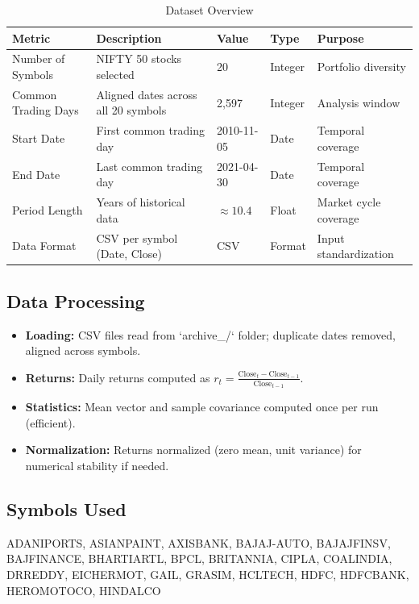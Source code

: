 \documentclass[12pt,a4paper]{article}
\begin{document}
\begin{longtable}[htp]{|p{2.5cm}|p{4cm}|p{2cm}|p{2.5cm}|p{2.5cm}|}
\caption{Dataset Overview}
\label{Table:DatasetOverview}
\hline \textbf{Metric} & \textbf{Description} & \textbf{Value} & \textbf{Type} & \textbf{Purpose} \\
\hline
Number of Symbols & NIFTY 50 stocks selected & 20 & Integer & Portfolio diversity \\
\hline
Common Trading Days & Aligned dates across all 20 symbols & 2,597 & Integer & Analysis window \\
\hline
Start Date & First common trading day & 2010-11-05 & Date & Temporal coverage \\
\hline
End Date & Last common trading day & 2021-04-30 & Date & Temporal coverage \\
\hline
Period Length & Years of historical data & $\approx 10.4$ & Float & Market cycle coverage \\
\hline
Data Format & CSV per symbol (Date, Close) & CSV & Format & Input standardization \\
\hline
\end{longtable}

\subsection{Data Processing}

\begin{itemize}
	\item \textbf{Loading:} CSV files read from `archive_/` folder; duplicate dates removed, aligned across symbols.
	\item \textbf{Returns:} Daily returns computed as $r_t = \frac{\text{Close}_t - \text{Close}_{t-1}}{\text{Close}_{t-1}}$.
	\item \textbf{Statistics:} Mean vector and sample covariance computed once per run (efficient).
	\item \textbf{Normalization:} Returns normalized (zero mean, unit variance) for numerical stability if needed.
\end{itemize}

\subsection{Symbols Used}

ADANIPORTS, ASIANPAINT, AXISBANK, BAJAJ-AUTO, BAJAJFINSV, BAJFINANCE, BHARTIARTL, BPCL, BRITANNIA, CIPLA, COALINDIA, DRREDDY, EICHERMOT, GAIL, GRASIM, HCLTECH, HDFC, HDFCBANK, HEROMOTOCO, HINDALCO
\end{document}
